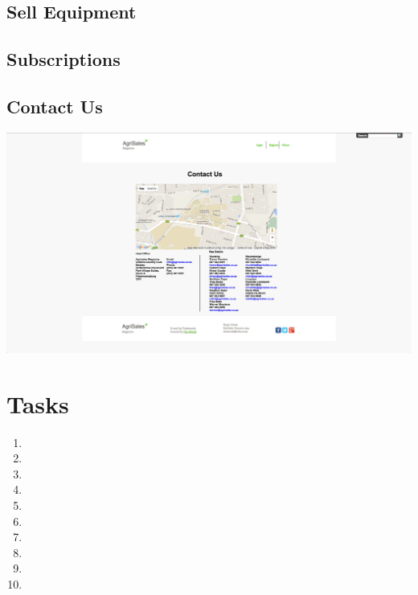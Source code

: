 \documentclass[11pt]{article}
\begin{document}
	\subsection{Sell Equipment}
	\subsection{Subscriptions}
	\subsection{Contact Us}
		\includegraphics[width=\textwidth]{../Images/ContactUs}

\newpage

\section{Tasks}
	\begin{enumerate}
		\item 
		\item 
		\item 
		\item 
		\item 
		\item 
		\item 
		\item 
		\item 
		\item 
	\end{enumerate}
\end{document}

